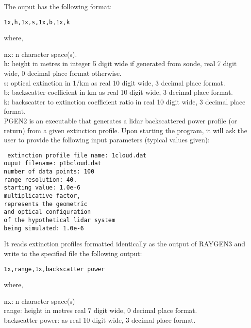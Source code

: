 \noindent
The ouput has the following format:

\begin{center}
		{\tt 1x,h,1x,s,1x,b,1x,k}
\end{center}
\noindent
where,

\noindent
nx: n character space(s).\\
h: height in metres in integer 5 digit wide if generated from sonde,
   real 7 digit wide, 0 decimal place format otherwise.\\
s: optical extinction in 1/km as real 10 digit wide, 3 decimal place format.\\
b: backscatter coefficient in km as real 10 digit wide, 3 decimal place format.\\
k: backscatter to extinction coefficient ratio in real
   10 digit wide, 3 decimal place format.\\

PGEN2 is an executable that generates a lidar backscattered power
profile (or return) from a given extinction profile.
Upon starting the program, it will ask the user to provide
the following input parameters (typical values given):


\noindent
{\tt
extinction profile file name: 	1cloud.dat\\
ouput filename:			p1bcloud.dat\\
number of data points:		100\\
range resolution:		40.\\
starting value:			1.0e-6\\
multiplicative factor,\\
represents the geometric\\ 
and optical configuration\\
of the hypothetical lidar system\\
being simulated:		1.0e-6\\
}

\noindent
It reads extinction profiles formatted identically as the output of
RAYGEN3 and write to the specified file the following output:

\begin{center}
		{\tt 1x,range,1x,backscatter power}
\end{center}
\noindent
where,

\noindent
nx: n character space(s)\\
range: height in metres real 7 digit wide, 0 decimal place format.\\
backscatter power: as real 10 digit wide, 3 decimal place format.\\

